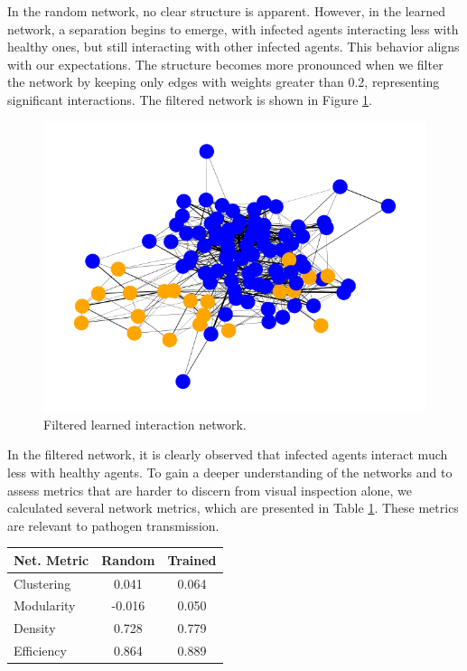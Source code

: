 \documentclass[9pt]{IEEEtran}
\begin{document}
In the random network, no clear structure is apparent. However, in the learned network, a separation begins to emerge, with infected agents interacting less with healthy ones, but still interacting with other infected agents. This behavior aligns with our expectations. The structure becomes more pronounced when we filter the network by keeping only edges with weights greater than 0.2, representing significant interactions. The filtered network is shown in Figure \ref{fig:filtered_net}.

\begin{figure}[hbt]
    \centering
    \includegraphics[width=0.9\linewidth]{filteredNet.png}
    \caption{Filtered learned interaction network.}
    \label{fig:filtered_net}
\end{figure}

In the filtered network, it is clearly observed that infected agents interact much less with healthy agents. To gain a deeper understanding of the networks and to assess metrics that are harder to discern from visual inspection alone, we calculated several network metrics, which are presented in Table \ref{tab:metrics}. These metrics are relevant to pathogen transmission. 

\begin{table}[htb]
    \centering
    \begin{tabular}{l|cc}
        \textbf{Net. Metric} & \textbf{Random} & \textbf{Trained}   \\ \hline
        Clustering        & 0.041  & 0.064     \\
        Modularity        & -0.016 & 0.050     \\
        Density           & 0.728  & 0.779     \\
        Efficiency        & 0.864  & 0.889    
    \end{tabular}
    \label{tab:metrics}
\end{table}
\end{document}
